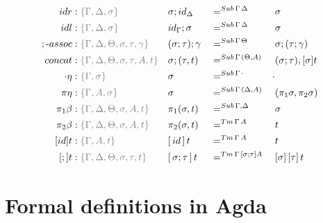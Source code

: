 \documentclass[a4paper,UKenglish,numberwithinsect,cleveref,thm-restate]{lipics-v2021}
\begin{document}
\begin{alignat*}{5}
  \mathsf{idr}    & : \implicit{\Gamma, \Delta, \sigma} && {\sigma ; \idS_{\Delta}} && =^{\Sub\,\Gamma\,\Delta} && {\sigma} \\
  \mathsf{idl}    & : \implicit{\Gamma, \Delta, \sigma} && {\idS_{\Gamma} ; \sigma} && =^{\Sub\,\Gamma\,\Delta} && {\sigma} \\
  ;\text{-}\mathsf{assoc} & : \implicit{\Gamma, \Delta, \Theta, \sigma, \tau, \gamma} && (\sigma ; \tau) ; \gamma && =^{\Sub\,\Gamma\,\Theta} &&  \sigma ; (\tau ; \gamma) \\
  \mathsf{concat} & : \implicit{\Gamma, \Delta, \Theta, \sigma, \tau, A, t} &&\sigma ; (\tau , t)      && =^{\Sub\,\Gamma\,(\Theta, A)} &&  (\sigma ; \tau) , [ \sigma ] t \\
  \emptyctx\eta   & : \implicit{\Gamma, \sigma} && \sigma                   && =^{\Sub\,\Gamma\,\emptyctx} & \emptysub \\
  \pi\eta         & : \implicit{\Gamma, A, \sigma} && \sigma                   && =^{\Sub\,\Gamma\,(\Delta, A)} &&  (\pi_1 \sigma, \pi_2 \sigma) \\
  \pi_1\beta      & : \implicit{\Gamma, \Delta, \Theta, \sigma, A, t} && \pi_1(\sigma , t)        && =^{\Sub\,\Gamma,\Delta} &&  \sigma \\
  \pi_2\beta      & : \implicit{\Gamma, \Delta, \Theta, \sigma, A, t} && \pi_2(\sigma , t)        && =^{\Tm\,\Gamma\, A} &&  t \\
  [\idS]t         & : \implicit{\Gamma, A, t} && {[\,\idS\,]\,t}          && =^{\Tm\,\Gamma\,A} && t \\
  [;]t            & :\implicit{\Gamma, \Delta, \Theta, \sigma, \tau, t} && {[\,\sigma ; \tau\,]\,t} && =^{\Tm\,\Gamma\,[\sigma ; \tau] A} && {[ \sigma ]\,[ \tau ]\,t} \\
\end{alignat*}

\section{Formal definitions in Agda}
\end{document}
